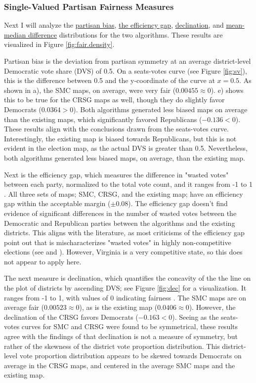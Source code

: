 \subsubsection{Single-Valued Partisan Fairness Measures}

Next I will analyze the \hyperref[sec:bias]{partisan bias}, \hyperref[sec:effgap]{the efficiency gap}, \hyperref[sec:declination]{declination}, and \hyperref[sec:meanmed]{mean-median difference} distributions for the two algorithms. These results are visualized in Figure \ref{fig:fair.density}.

Partisan bias is the deviation from partisan symmetry at an average district-level Democratic vote share (DVS) of 0.5. On a seats-votes curve (see Figure \ref{fig:sv}), this is the difference between 0.5 and the y-coordinate of the curve at $x=0.5$. As shown in a), the SMC maps, on average, were very fair ($0.00455 \approx 0$). e) shows this to be true for the CRSG maps as well, though they do slightly favor Democrats ($0.0364 > 0$). Both algorithms generated less biased maps on average than the existing maps, which significantly favored Republicans ($-0.136 < 0$). These results align with the conclusions drawn from the seats-votes curve. Interestingly, the existing map is biased towards Republicans, but this is not evident in the election map, as the actual DVS is greater than 0.5. Nevertheless, both algorithms generated less biased maps, on average, than the existing map. 

Next is the efficiency gap, which measures the difference in "wasted votes" between each party, normalized to the total vote count, and it ranges from -1 to 1 \parencite{stephanopoulos2015}. All three sets of maps; SMC, CRSG, and the existing map; have an efficiency gap within the acceptable margin ($\pm 0.08$). The efficiency gap doesn't find evidence of significant differences in the number of wasted votes between the Democratic and Republican parties between the algorithms and the existing districts. This aligns with the literature, as most criticisms of the efficiency gap point out that is mischaracterizes "wasted votes" in highly non-competitive elections (see \textcite{veomett2018} and \textcite{katz2020}). However, Virginia is a very competitive state, so this does not appear to apply here.

The next measure is declination, which quantifies the concavity of the the line on the plot of districts by ascending DVS; see Figure \ref{fig:dec} for a visualization. It ranges from -1 to 1, with values of 0 indicating fairness \parencite{warrington2018}. The SMC maps are on average fair ($0.00523 \approx 0$), as is the existing map ($0.0406 \approx 0$). However, the declination of the CRSG favors Democrats ($-0.163 < 0$). Seeing as the seats-votes curves for SMC and CRSG were found to be symmetrical, these results agree with the findings of \textcite{katz2020} that declination is not a measure of symmetry, but rather of the skewness of the district vote proportion distribution. This district-level vote proportion distribution appears to be skewed towards Democrats on average in the CRSG maps, and centered in the average SMC maps and the existing map. 

